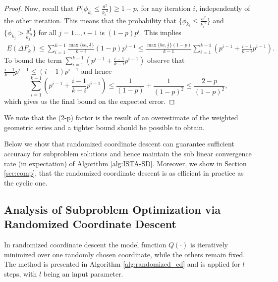 \documentclass[11pt]{article}
\numberwithin{equation}{section}
\begin{document}
\begin{proof}
	Now, recall that  $P\{\phi_{k_i} \leq \frac{a^2}{{k_i}^2}\}\geq 1-p$, for any iteration $i$, independently of the other iteration. 
	This means that the probability that 
	$\{\phi_{k_i} \leq \frac{a^2}{{k_i}^2}\}$ and $\{\phi_{k_j} > \frac{a^2}{{k_j}^2}\}$ for all $j=1\ldots, i-1$ is $(1-p)p^i$. 
	  This implies
		\begin{align}\label{eq:finalsum}
	    E(\Delta F_{k }) \leq  \sum_{i=1}^{k-1}  \frac{\max\{ba, \frac{1}{c}\}}{k-i}(1-p)p^{i-1}\leq\frac{ \max\{ba, \frac{1}{c}\}(1-p)}{k-1} 
	    \sum_{i=1}^{k-1} ( p^{i-1}+\frac{i-1}{k-i}p^{i-1}).
	\end{align}
	To bound the term $\sum_{i=1}^{k-1} ( p^{i-1}+\frac{i-1}{k-i}p^{i-1})$ observe that $\frac{i-1}{k-i}p^{i-1}\leq (i-1)p^{i-1}$ and hence
	\[
	\sum_{i=1}^{k-1} ( p^{i-1}+\frac{i-1}{k-i}p^{i-1})\leq \frac{1}{(1-p)}+\frac{1}{(1-p)^2}\leq \frac{2-p}{(1-p)^2},
	\]
which gives us the final bound on the expected error. 
\end{proof}

We note that the (2-p) factor  is the result of an overestimate of the weighted geometric series and a tighter bound should be possible to obtain. 



Below we show that randomized coordinate descent can guarantee sufficient accuracy for subproblem solutions and hence maintain the sub linear convergence rate (in expectation) of Algorithm \ref{alg:ISTA-SD}. Moreover, we show in Section \ref{sec:comp}, that the randomized coordinate descent is as efficient in practice as the cyclic one. 




\subsection{Analysis of Subproblem Optimization via Randomized Coordinate Descent} %
\label{sec:coordinate_descent_iteration_complexity}
In randomized coordinate descent the model function $Q(\cdot)$ is iteratively minimized over one randomly chosen coordinate, while the others remain fixed. 
The method  is presented in Algorithm \ref{alg:randomized_cd} and is applied for $l$ steps, with $l$ being an input parameter. 
\end{document}
